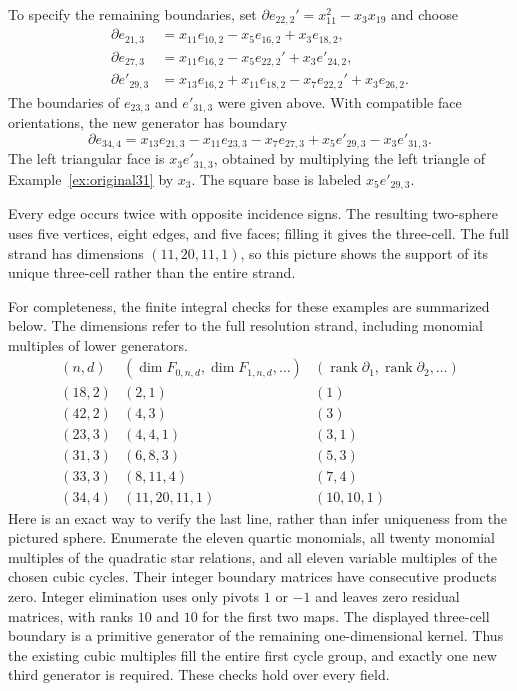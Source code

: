 \begin{example}
\begin{center}
\end{center}
To specify the remaining boundaries, set
$\partial e_{22,2}'=x_{11}^2-x_3x_{19}$ and choose
\[
\begin{aligned}
 \partial e_{21,3}
   &=x_{11}e_{10,2}-x_5e_{16,2}+x_3e_{18,2},\\
 \partial e_{27,3}
   &=x_{11}e_{16,2}-x_5e_{22,2}'+x_3e'_{24,2},\\
 \partial e'_{29,3}
   &=x_{13}e_{16,2}+x_{11}e_{18,2}
      -x_7e_{22,2}'+x_3e_{26,2}.
\end{aligned}
\]
The boundaries of $e_{23,3}$ and $e'_{31,3}$ were given above. With compatible
face orientations, the new generator has boundary
\[
 \partial e_{34,4}
 =x_{13}e_{21,3}-x_{11}e_{23,3}-x_7e_{27,3}
   +x_5e'_{29,3}-x_3e'_{31,3}.
\]
The left triangular face is $x_3e'_{31,3}$, obtained by multiplying
the left triangle of Example~\ref{ex:original31} by $x_3$.
The square base is labeled $x_5e'_{29,3}$.

Every edge occurs twice with opposite incidence signs. The resulting
two-sphere uses five vertices, eight edges, and five faces; filling it
gives the three-cell. The full strand has dimensions $(11,20,11,1)$,
so this picture shows the support of its unique three-cell rather
than the entire strand.

For completeness, the finite integral checks for these examples are
summarized below. The dimensions refer to the full resolution strand,
including monomial multiples of lower generators.
\[
\begin{array}{c|c|c}
 (n,d)&(\dim F_{0,n,d},\dim F_{1,n,d},\ldots)
       &(\operatorname{rank}\partial_1,\operatorname{rank}\partial_2,\ldots)\\\hline
 (18,2)&(2,1)&(1)\\
 (42,2)&(4,3)&(3)\\
 (23,3)&(4,4,1)&(3,1)\\
 (31,3)&(6,8,3)&(5,3)\\
 (33,3)&(8,11,4)&(7,4)\\
 (34,4)&(11,20,11,1)&(10,10,1)
\end{array}
\]
Here is an exact way to verify the last line, rather than infer
uniqueness from the pictured sphere. Enumerate the eleven quartic
monomials, all twenty monomial multiples of the quadratic star
relations, and all eleven variable multiples of the chosen cubic
cycles. Their integer boundary matrices have consecutive products
zero. Integer elimination uses only pivots $1$ or $-1$ and leaves
zero residual matrices, with ranks $10$ and $10$ for the first two
maps. The displayed three-cell boundary is a primitive generator
of the remaining one-dimensional kernel. Thus the existing cubic
multiples fill the entire first cycle group, and exactly one new
third generator is required. These checks hold over every field.


\end{example}
